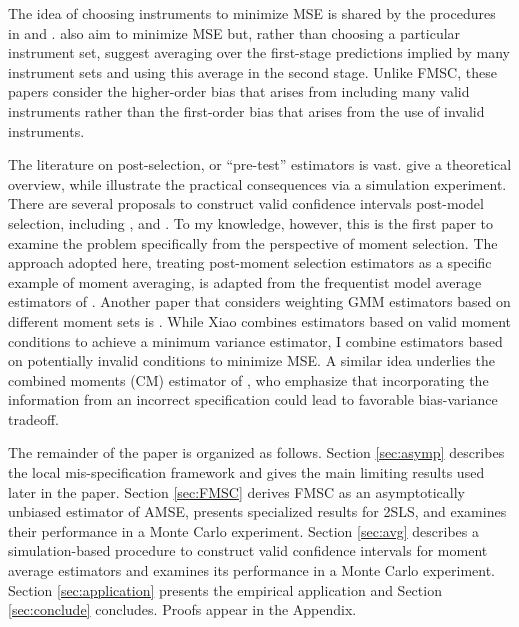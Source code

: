\documentclass[12pt]{article}
\theoremstyle{definition}
\begin{document}
The idea of choosing instruments to minimize MSE is shared by the procedures in \cite{DonaldNewey2001} and \cite{DonaldImbensNewey2009}. \cite{KuersteinerOkui2010} also aim to minimize MSE but, rather than choosing a particular instrument set, suggest averaging over the first-stage predictions implied by many instrument sets and using this average in the second stage. Unlike FMSC, these papers consider the higher-order bias that arises from including many valid instruments rather than the first-order bias that arises from the use of invalid instruments.

The literature on post-selection, or ``pre-test'' estimators is vast. \citet{LeebPoetscher2005, LeebPoetscher2009}  give a theoretical overview, while \cite{Demetrescu} illustrate the practical consequences via a simulation experiment. There are several proposals to construct valid confidence intervals post-model selection, including \cite{Kabaila1998}, \cite{HjortClaeskens} and \cite{KabailaLeeb2006}. To my knowledge, however, this is the first paper to examine the problem specifically from the perspective of moment selection. The approach adopted here, treating post-moment selection estimators as a specific example of moment averaging, is adapted from the frequentist model average estimators of \cite{HjortClaeskens}. Another paper that considers weighting GMM estimators based on different moment sets is \cite{Xiao}. While Xiao combines estimators based on valid moment conditions to achieve a minimum variance estimator, I combine estimators based on potentially invalid conditions to minimize MSE. A similar idea underlies the combined moments (CM) estimator of \cite{Judge2007}, who emphasize that incorporating the information from an incorrect specification could lead to favorable bias-variance tradeoff. %


The remainder of the paper is organized as follows. Section \ref{sec:asymp} describes the local mis-specification framework and gives the main limiting results used later in the paper. Section \ref{sec:FMSC} derives FMSC as an asymptotically unbiased estimator of AMSE, presents specialized results for 2SLS, and examines their performance in a Monte Carlo experiment. Section \ref{sec:avg} describes a simulation-based procedure to construct valid confidence intervals for moment average estimators and examines its performance in a Monte Carlo experiment. Section \ref{sec:application} presents the empirical application and Section \ref{sec:conclude} concludes. Proofs appear in the Appendix.
\end{document}
